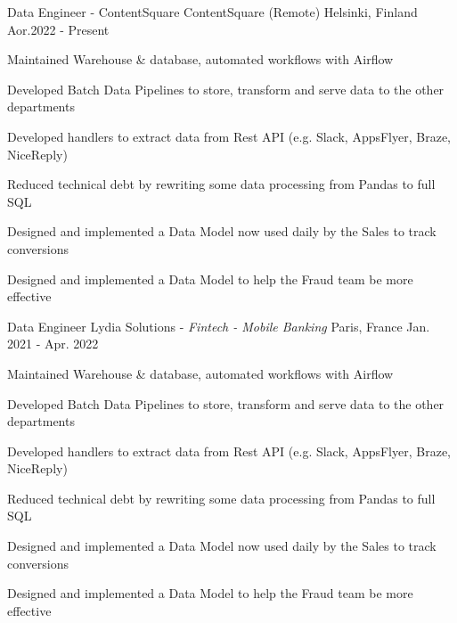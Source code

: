 

\begin{cventries}

\cventry
{Data Engineer - ContentSquare} %
{ContentSquare} %
{(Remote) Helsinki, Finland} %
{Aor.2022 - Present} %
{
  \begin{cvitems} %
    \item {Maintained Warehouse \& database,  automated workflows with Airflow}
    \item {Developed Batch Data Pipelines to store, transform and serve data to the other departments}
    \item {Developed handlers to extract data from Rest API (e.g. Slack, AppsFlyer, Braze, NiceReply)}
    \item {Reduced technical debt by rewriting some data processing from Pandas to full SQL}
    \item {Designed and implemented a Data Model now used daily by the Sales to track conversions}
    \item {Designed and implemented a Data Model to help the Fraud team be more effective}
  \end{cvitems}
}

\cventry
{Data Engineer} %
{Lydia Solutions - \emph{Fintech - Mobile Banking}} %
{Paris, France} %
{Jan. 2021 - Apr. 2022} %
{
  \begin{cvitems} %
    \item {Maintained Warehouse \& database,  automated workflows with Airflow}
    \item {Developed Batch Data Pipelines to store, transform and serve data to the other departments}
    \item {Developed handlers to extract data from Rest API (e.g. Slack, AppsFlyer, Braze, NiceReply)}
    \item {Reduced technical debt by rewriting some data processing from Pandas to full SQL}
    \item {Designed and implemented a Data Model now used daily by the Sales to track conversions}
    \item {Designed and implemented a Data Model to help the Fraud team be more effective}
  \end{cvitems}
}


\end{cventries}
